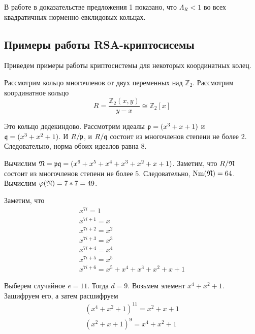 \documentclass[_00_dissertation.tex]{subfiles}
\begin{document}
\begin{remark}
    В работе \cite{source:Vaskouski_CSIST} в доказательстве предложения 1 показано, что $\Lambda_{R} < 1$ во всех квадратичных норменно-евклидовых кольцах.
\end{remark}

\subsection{Примеры работы RSA-криптосисемы}

Приведем примеры работы криптосистемы для некоторых координатных колец.

\begin{example}
	Рассмотрим кольцо многочленов от двух переменных над $\mathbb{Z}_2$.
	Рассмотрим координатное кольцо
	\begin{equation*}
		R = \frac{\mathbb{Z}_2(x, y)}{y-x} \cong \mathbb{Z}_2[x]
	\end{equation*}
	
	Это кольцо дедекиндово.
	Рассмотрим идеалы $\mathfrak{p} = (x^3 + x + 1)$ и $\mathfrak{q} = (x^3 + x^2 + 1)$.
	И $R/\mathfrak{p}$, и $R/\mathfrak{q}$ состоит из многочленов степени не более $2$.
	Следовательно, норма обоих идеалов равна $8$.
	
	Вычислим $\mathfrak{N} = \mathfrak{p}\mathfrak{q} = (x^6 + x^5 + x^4 + x^3 + x^2 + x + 1)$.
	Заметим, что $R/\mathfrak{N}$ состоит из многочленов степени не более $5$.
	Следовательно, $\textrm{Nm}(\mathfrak{N}) = 64$.
	Вычислим $\varphi(\mathfrak{N}) = 7 * 7 = 49$.

	Заметим, что
	\begin{equation*}
		\begin{array}{l}
			x^{7i} = 1\\
			x^{7i+1} = x\\
			x^{7i+2} = x^2\\
			x^{7i+3} = x^3\\
			x^{7i+4} = x^4\\
			x^{7i+5} = x^5\\
			x^{7i+6} = x^5 + x^4 + x^3 + x^2 + x + 1
		\end{array}
	\end{equation*}

	Выберем случайное $e = 11$.
	Тогда $d = 9$.
	Возьмем элемент $x^4 + x^2 + 1$.
	Зашифруем его, а затем расшифруем
	\begin{equation*}
	    \begin{split}
    		(x^4 + x^2 + 1)^{11} = x^2 + x + 1\\
    		(x^2 + x + 1)^{9} = x^4 + x^2 + 1
	    \end{split}
	\end{equation*}
\end{example}
\end{document}
